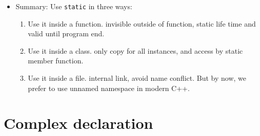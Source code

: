 \documentclass[a4paper,11pt,twoside]{book}
\begin{document}
\begin{itemize}
	
	\item Summary: Use \texttt{static} in three ways:
	\begin{enumerate}
		\item Use it inside a function. invisible outside of function, static life time and valid until program end.
		
		\item Use it inside a class. only copy for all instances, and access by static member function.
		
		\item Use it inside a file. internal link, avoid name conflict. But by now, we prefer to use unnamed namespace in modern C++.
	\end{enumerate}
\end{itemize}


\section{Complex declaration}
\end{document}
